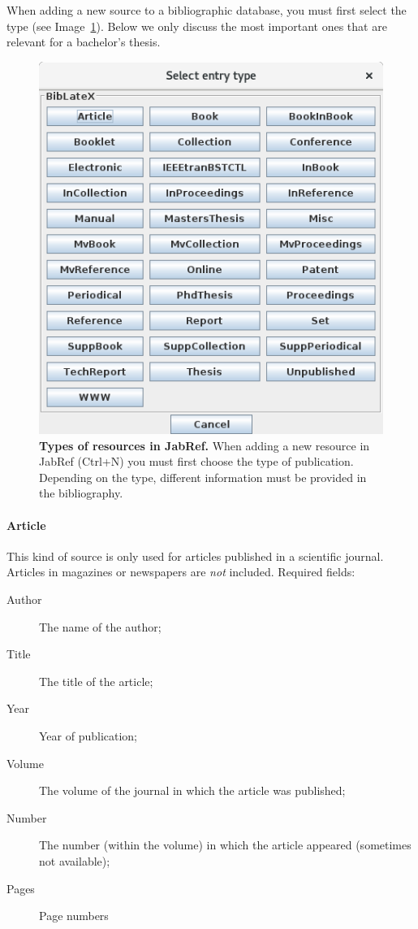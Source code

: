 When adding a new source to a bibliographic database, you must first select the type (see Image~\ref{fig:jabref-entrytypes}). Below we only discuss the most important ones that are relevant for a bachelor's thesis.

\begin{figure}
  \centering
  \includegraphics[width=0.6\linewidth]{img/jabref-entrytypes}
  \caption[Types of resources in JabRef]{\textbf{Types of resources in JabRef.} When adding a new resource in JabRef (Ctrl+N) you must first choose the type of publication. Depending on the type, different information must be provided in the bibliography.}
  \label{fig:jabref-entrytypes}
\end{figure}

\paragraph{Article}

This kind of source is only used for articles published in a scientific journal. Articles in magazines or newspapers are \emph{not} included. Required fields:

\begin{description}
  \item[Author] The name of the author;
  \item[Title] The title of the article;
  \item[Year] Year of publication;
  \item[Volume] The volume of the journal in which the article was published;
  \item[Number] The number (within the volume) in which the article appeared (sometimes not available);
  \item[Pages] Page numbers
\end{description}

